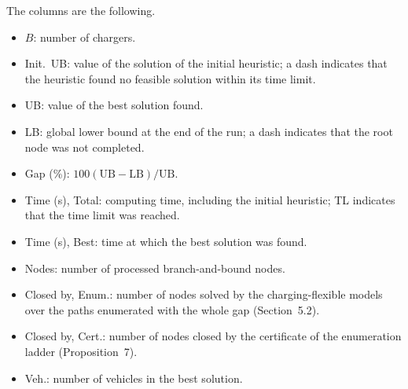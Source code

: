 \documentclass[10pt]{article}
\begin{document}
The columns are the following.
\begin{itemize}
\setlength{\itemsep}{0.2em}
\item $B$: number of chargers.
\item Init.\ UB: value of the solution of the initial heuristic; a dash indicates that the heuristic found no feasible solution within its time limit.
\item UB: value of the best solution found.
\item LB: global lower bound at the end of the run; a dash indicates that the root node was not completed.
\item Gap (\%): $100(\mathrm{UB}-\mathrm{LB})/\mathrm{UB}$.
\item Time (s), Total: computing time, including the initial heuristic; TL indicates that the time limit was reached.
\item Time (s), Best: time at which the best solution was found.
\item Nodes: number of processed branch-and-bound nodes.
\item Closed by, Enum.: number of nodes solved by the charging-flexible models over the paths enumerated with the whole gap (Section~5.2).
\item Closed by, Cert.: number of nodes closed by the certificate of the enumeration ladder (Proposition~7).
\item Veh.: number of vehicles in the best solution.
\end{itemize}
\clearpage
\end{document}
